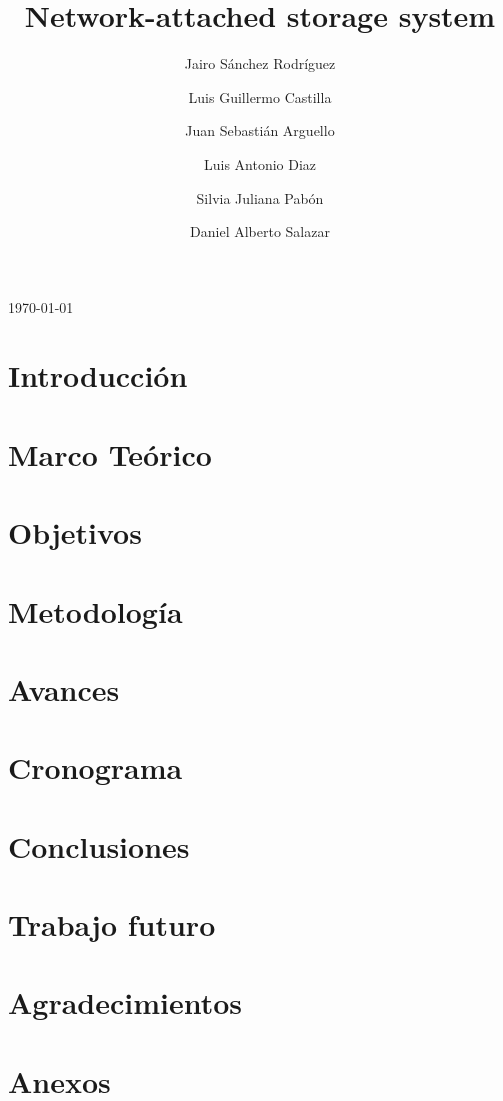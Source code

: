 \documentclass[runningheads]{llncs}
\begin{document}
%
\title{Network-attached storage system}
%
\author{Jairo Sánchez Rodríguez \and
Luis Guillermo Castilla\and
Juan Sebastián Arguello\and
Luis Antonio Diaz\and
Silvia Juliana Pabón\and
Daniel Alberto Salazar}
%
%
%
\maketitle              
%
\begin{center}
    \today    
\end{center}
%

%
\section{Introducción}

%
\section{Marco Teórico}

%
\section{Objetivos}

%
\section{Metodología}

%
\section{Avances}

%
\section{Cronograma}

%
\section{Conclusiones}

%
\section{Trabajo futuro}

%
\section{Agradecimientos}

%
\section{Anexos}

%
%


\end{document}
